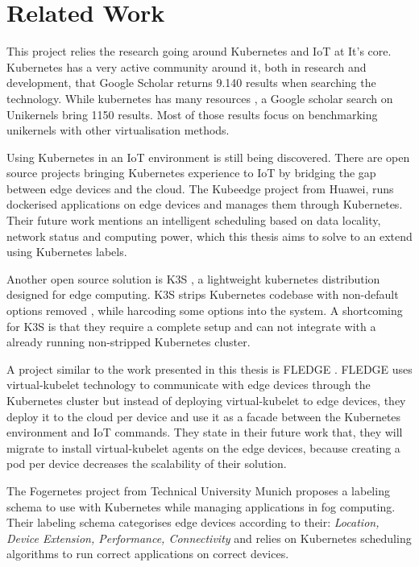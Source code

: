 
\chapter{Related Work}\label{chapter:literature}

This project relies the research going around Kubernetes and IoT at It's core. Kubernetes has a very active community around it, both in research and development, that Google Scholar returns 9.140 results when searching the technology. While kubernetes has many resources , a Google scholar search on Unikernels bring 1150 results. Most of those results focus on benchmarking unikernels with other virtualisation methods.

Using Kubernetes in an IoT environment is still being discovered. There are open source projects bringing Kubernetes experience to IoT by bridging the gap between edge devices and the cloud. The Kubeedge project \cite{kubeedge} from Huawei, runs dockerised applications on edge devices and manages them through Kubernetes. Their future work mentions an intelligent scheduling based on data locality, network status and computing power, which this thesis aims to solve to an extend using Kubernetes labels.

Another open source solution is K3S \cite{k3s}, a lightweight kubernetes distribution designed for edge computing. K3S strips Kubernetes codebase with non-default options removed , while harcoding some options into the system. A shortcoming for K3S is that they require a complete setup and can not integrate with a already running non-stripped Kubernetes cluster.

A project similar to the work presented in this thesis is FLEDGE \cite{fledge}. FLEDGE uses virtual-kubelet technology to communicate with edge devices through the Kubernetes cluster but instead of deploying virtual-kubelet to edge devices, they deploy it to the cloud per device and use it as a facade between the Kubernetes environment and IoT commands. They state in their future work that, they will migrate to install virtual-kubelet agents on the edge devices, because creating a pod per device decreases the scalability of their solution.

The Fogernetes project\cite{fogernetes} from Technical University Munich proposes a labeling schema to use with Kubernetes while managing applications in fog computing. Their labeling schema categorises edge devices according to their: \textit{Location, Device Extension, Performance, Connectivity} and relies on Kubernetes scheduling algorithms to run correct applications on correct devices.

